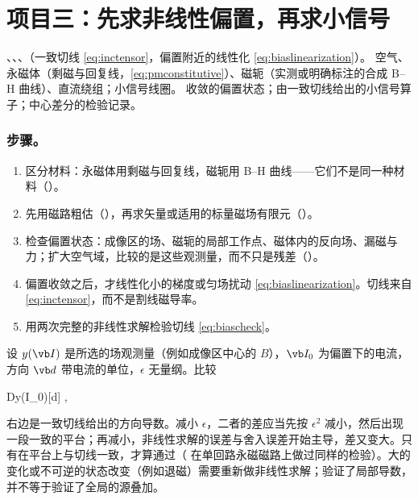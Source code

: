 \section{项目三：先求非线性偏置，再求小信号}\label{sec:projects-p3}

{、、、（一致切线 \eqref{eq:inctensor}，偏置附近的线性化 \eqref{eq:biaslinearization}）。}
{空气、永磁体（剩磁与回复线，\eqref{eq:pmconstitutive}）、磁轭（实测或明确标注的合成 B--H 曲线）、直流绕组；小信号线圈。}
{收敛的偏置状态；由一致切线给出的小信号算子；中心差分的检验记录。}

\subsubsection{步骤。}
\begin{enumerate}
\item 区分材料：永磁体用剩磁与回复线，磁轭用 B--H 曲线——它们不是同一种材料（）。
\item 先用磁路粗估（），再求矢量或适用的标量磁场有限元（）。
\item 检查偏置状态：成像区的场、磁轭的局部工作点、磁体内的反向场、漏磁与力；扩大空气域，比较的是这些观测量，而不只是残差（）。
\item 偏置收敛之后，才线性化小的梯度或匀场扰动 \eqref{eq:biaslinearization}。切线来自 \eqref{eq:inctensor}，而不是割线磁导率。
\item 用两次完整的非线性求解检验切线 \eqref{eq:biascheck}。
\end{enumerate}

设 $y(\vb I)$ 是所选的场观测量（例如成像区中心的 $B$），$\vb I_0$ 为偏置下的电流，方向 $\vb d$ 带电流的单位，$\epsilon$ 无量纲。比较
\begin{keyeq}
\quad{}\quad
\mathrm Dy(\vb I_0)[\vb d] ,
\label{eq:biascheck}
\end{keyeq}
右边是一致切线给出的方向导数。减小 $\epsilon$，二者的差应当先按 $\epsilon^2$ 减小，然后出现一段一致的平台；再减小，非线性求解的误差与舍入误差开始主导，差又变大。只有在平台上与切线一致，才算通过（ 在单回路永磁磁路上做过同样的检验）。大的变化或不可逆的状态改变（例如退磁）需要重新做非线性求解；验证了局部导数，并不等于验证了全局的源叠加。

